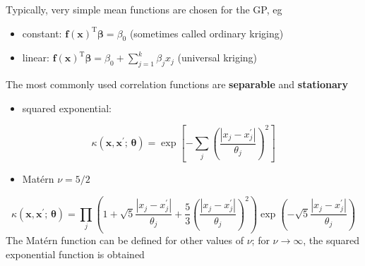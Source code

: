 \documentclass[
  ignorenonframetext,
]{beamer}
\providecommand{\tightlist}{%
  \setlength{\itemsep}{0pt}\setlength{\parskip}{0pt}}
\begin{document}
\begin{frame}{}
\protect\hypertarget{section-43}{}
Typically, very simple mean functions are chosen for the GP, eg

\begin{itemize}
\tightlist
\item
  constant:
  \(\boldsymbol{f}(\boldsymbol{x})^\mathrm{T}\boldsymbol{\beta}= \beta_0\)
  (sometimes called ordinary kriging)
\item
  linear:
  \(\boldsymbol{f}(\boldsymbol{x})^\mathrm{T}\boldsymbol{\beta}= \beta_0 + \sum_{j=1}^k\beta_jx_j\)
  (universal kriging)
\end{itemize}

The most commonly used correlation functions are \textbf{separable} and
\textbf{stationary}

\begin{itemize}
\tightlist
\item
  squared exponential:
\end{itemize}

\[
  \kappa(\boldsymbol{x}, \boldsymbol{x}^\prime;\,\boldsymbol{\theta})=\exp\left[-\sum_j\left(\frac{|x_{j} - x^\prime_{j} |}{\theta_j }\right)^2\right]
  \]

\begin{itemize}
\tightlist
\item
  Matérn \(\nu = 5/2\)
\end{itemize}

\[
  \kappa(\boldsymbol{x}, \boldsymbol{x}^\prime; \,\boldsymbol{\theta}) = \prod_{j}\left(1 + \sqrt{5}\frac{|x_j - x_j^\prime|}{\theta_j} + \frac{5}{3}\left(\frac{|x_j - x_j^\prime|}{\theta_j}\right)^2\right)\exp\left(-\sqrt{5}\frac{|x_j - x_j^\prime|}{\theta_j}\right)
  \] The Matérn function can be defined for other values of \(\nu\); for
\(\nu\rightarrow\infty\), the squared exponential function is obtained
\end{frame}
\end{document}
